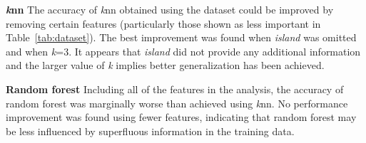 \documentclass[a4paper, 11pt]{article}
\begin{document}
\textbf{\textit{k}nn}  
The accuracy of \textit{k}nn obtained using the dataset could be improved by removing certain features 
(particularly those shown as less important in Table~\ref{tab:dataset}).
The best improvement was found when \textit{island} was omitted and when \textit{k}=3. It appears that \textit{island} did not provide 
any additional information and the larger value of \textit{k} implies better generalization has been achieved.

\textbf{Random forest}  
Including all of the features in the analysis, the accuracy of random forest was marginally worse 
than achieved using \textit{k}nn. 
No performance improvement was found using fewer features, indicating that random forest
may be less influenced by superfluous information in the training data. 
\end{document}
